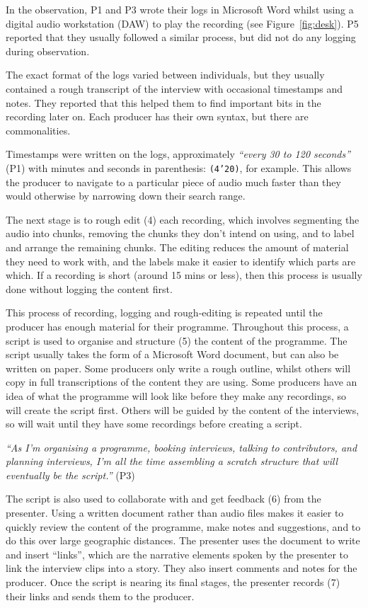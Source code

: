 In the observation, P1 and P3 wrote their logs in Microsoft Word whilst using a digital audio workstation (DAW) to play
the recording (see Figure~\ref{fig:desk}). P5 reported that they usually followed a similar process, but did not do any
logging during observation.

The exact format of the logs varied between individuals, but they usually contained a rough transcript of the interview
with occasional timestamps and notes. They reported that this helped them to find important bits in the recording later
on. Each producer has their own syntax, but there are commonalities.

Timestamps were written on the logs, approximately \textit{``every 30 to 120 seconds''} (P1) with minutes and seconds
in parenthesis: \texttt{(4'20)}, for example.  This allows the producer to navigate to a particular piece of audio much
faster than they would otherwise by narrowing down their search range.

The next stage is to rough edit (4) each recording, which involves segmenting the audio into chunks, removing the
chunks they don't intend on using, and to label and arrange the remaining chunks.  The editing reduces the amount of
material they need to work with, and the labels make it easier to identify which parts are which.  If a recording is
short (around 15 mins or less), then this process is usually done without logging the content first.

This process of recording, logging and rough-editing is repeated until the producer has enough material for their
programme. Throughout this process, a script is used to organise and structure (5) the content of the programme.  The
script usually takes the form of a Microsoft Word document, but can also be written on paper. Some producers only write
a rough outline, whilst others will copy in full transcriptions of the content they are using.  Some producers have an
idea of what the programme will look like before they make any recordings, so will create the script first. Others will
be guided by the content of the interviews, so will wait until they have some recordings before creating a script.

\textit{``As I'm organising a programme, booking interviews, talking to contributors, and planning interviews, I'm all
the time assembling a scratch structure that will eventually be the script.''} (P3)

The script is also used to collaborate with and get feedback (6) from the presenter.  Using a written document rather
than audio files makes it easier to quickly review the content of the programme, make notes and suggestions, and to do
this over large geographic distances. The presenter uses the document to write and insert ``links'', which are the
narrative elements spoken by the presenter to link the interview clips into a story. They also insert comments and
notes for the producer. Once the script is nearing its final stages, the presenter records (7) their links and sends
them to the producer.

